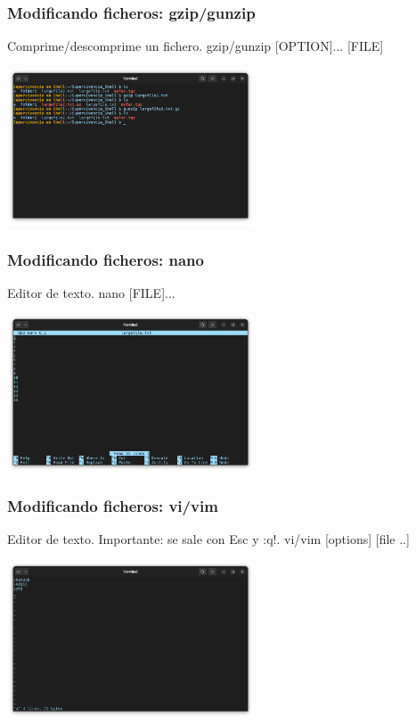 \documentclass[10pt]{beamer}
\begin{document}
	\begin{frame}
		\frametitle{Modificando ficheros: gzip/gunzip}
		\begin{alertblock}{Comprime/descomprime un fichero.}
			gzip/gunzip [OPTION]... [FILE]
		\end{alertblock}
		\begin{center}
			\includegraphics[width=0.55\textwidth]{gzip}
		\end{center}
	\end{frame}
		
	\begin{frame}
		\frametitle{Modificando ficheros: nano}
		\begin{alertblock}{Editor de texto.}
			nano [FILE]...
		\end{alertblock}
		\begin{center}
			\includegraphics[width=0.55\textwidth]{nano}
		\end{center}
	\end{frame}
	
	\begin{frame}
		\frametitle{Modificando ficheros: vi/vim}
		\begin{alertblock}{Editor de texto. Importante: se sale con Esc y :q!.}
			vi/vim [options] [file ..]
		\end{alertblock}
		\begin{center}
			\includegraphics[width=0.55\textwidth]{vim}
		\end{center}
	\end{frame}
	
\end{document}
